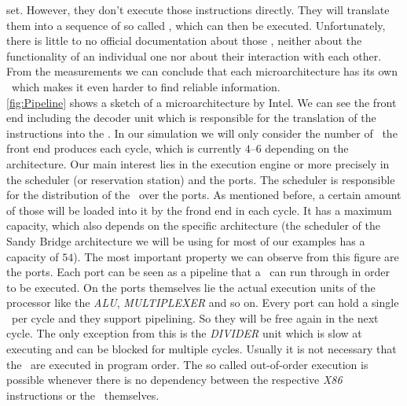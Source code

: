 set. However, they don't execute those instructions directly. They will translate them into a sequence of so called \microops, which can then be executed. Unfortunately, there is little to no official documentation about those \microops, neither about the functionality of an individual one nor about their interaction with each other. From the measurements we can conclude that each microarchitecture has its own \microops\ which makes it even harder to find reliable information.\\ \autoref{fig:Pipeline} shows a sketch of a microarchitecture by Intel. We can see the front end including the decoder unit which is responsible for the translation of the instructions into the \microops. In our simulation we will only consider the number of \microops\ the front end produces each cycle, which is currently $4$--$6$ depending on the architecture. Our main interest lies in the execution engine or more precisely in the scheduler (or reservation station) and the ports. The scheduler is responsible for the distribution of the \microops\ over the ports. As mentioned before, a certain amount of those will be loaded into it by the frond end in each cycle. It has a maximum capacity, which also depends on the specific architecture (the scheduler of the Sandy Bridge architecture we will be using for most of our examples has a capacity of $54$). The most important property we can observe from this figure are the ports. Each port can be seen as a pipeline that a \microop\ can run through in order to be executed. On the ports themselves lie the actual execution units of the processor like the \emph{ALU}, \emph{MULTIPLEXER} and so on. Every port can hold a single \microop\ per cycle and they support pipelining. So they will be free again in the next cycle. The only exception from this is the \emph{DIVIDER} unit which is slow at executing and can be blocked for multiple cycles. Usually it is not necessary that the \microops\ are executed in program order. The so called out-of-order execution is possible whenever there is no dependency between the respective \emph{X86} instructions or the \microops\ themselves.
 
 
 
 
